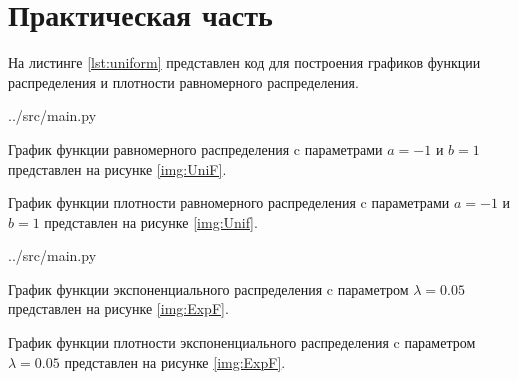 \chapter{Практическая часть}

На листинге \ref{lst:uniform} представлен код для построения графиков функции распределения и плотности равномерного распределения.

\begin{lstinputlisting}[label=lst:uniform,caption=Построение графиков для равномерного распределения, language=python, firstline=5, lastline=22]{../src/main.py}
\end{lstinputlisting}

График функции равномерного распределения c параметрами $a = -1$ и $b = 1$ представлен на рисунке \ref{img:UniF}. 


График функции плотности равномерного распределения c параметрами $a = -1$ и $b = 1$ представлен на рисунке \ref{img:Unif}.


\begin{lstinputlisting}[label=lst:uniform,caption=Построение графиков для экспоненциального распределения, language=python, firstline=24, lastline=41]{../src/main.py}
\end{lstinputlisting}

График функции экспоненциального распределения c параметром $\lambda = 0.05$ представлен на рисунке \ref{img:ExpF}. 


График функции плотности экспоненциального распределения c параметром $\lambda = 0.05$ представлен на рисунке \ref{img:ExpF}. 

